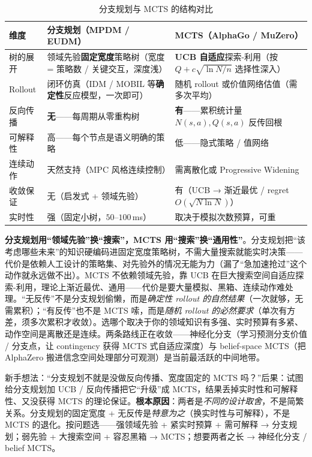 \begin{table}[H]\centering\small
\caption{分支规划与 MCTS 的结构对比}
\label{tab:pr-mcts}
\begin{tabular}{p{} p{} p{}}
\toprule
维度 & 分支规划（MPDM / EUDM） & MCTS（AlphaGo / MuZero） \\
\midrule
树的展开 & 领域先验\textbf{固定宽度}策略树（宽度 = 策略数 / 关键交互，深度浅） & \textbf{UCB 自适应}探索-利用（按 $Q+c\sqrt{\ln N/n}$ 选择性深入） \\
Rollout & 闭环仿真（IDM / MOBIL 等\textbf{确定性}反应模型，一次即可） & 随机 rollout 或价值网络估值（需多次平均） \\
反向传播 & \textbf{无}——每周期从零重构树 & \textbf{有}——累积统计量 $N(s,a),Q(s,a)$ 反传回根 \\
可解释性 & 高——每个节点是语义明确的策略 & 低——隐式策略 / 值网络 \\
连续动作 & 天然支持（MPC 风格连续控制） & 需离散化或 Progressive Widening \\
收敛保证 & 无（启发式 + 领域先验） & 有（UCB → 渐近最优 / regret $O(\sqrt{N\ln N})$） \\
实时性 & 强（固定小树，$50$--$100\,$ms） & 取决于模拟次数预算，可重 \\
\bottomrule
\end{tabular}
\end{table}

\begin{insight}
\textbf{分支规划用“领域先验”换“搜索”，MCTS 用“搜索”换“通用性”}。分支规划把“该考虑哪些未来”的知识硬编码进固定宽度策略树，不需大量搜索就能实时决策——代价是依赖人工设计的策略集、对先验外的情况无能为力（漏了“急加速抢过”这个动作就永远做不出）。MCTS 不依赖领域先验，靠 UCB 在巨大搜索空间自适应探索-利用，理论上渐近最优、通用——代价是要大量模拟、黑箱、连续动作难处理。“无反传”不是分支规划偷懒，而是\emph{确定性 rollout 的自然结果}（一次就够，无需累积）；“有反传”也不是 MCTS 嗦，而是\emph{随机 rollout 的必然要求}（单次有方差，须多次累积才收敛）。选哪个取决于你的领域知识有多强、实时预算有多紧、动作空间是离散还是连续。两条路线正在收敛——神经化分支（学习预测分支价值 / 分支点，让 contingency 获得 MCTS 式自适应深度）与 belief-space MCTS（把 AlphaZero 搬进信念空间处理部分可观测）是当前最活跃的中间地带。
\end{insight}

\begin{pitfall}
新手想法：“分支规划不就是没做反向传播、宽度固定的 MCTS 吗？”后果：试图给分支规划加 UCB / 反向传播把它“升级”成 MCTS，结果丢掉实时性和可解释性、又没获得 MCTS 的理论保证。\textbf{根本原因}：两者是\emph{不同的设计取舍}，不是简繁关系。分支规划的固定宽度 + 无反传是\emph{特意为之}（换实时性与可解释），不是 MCTS 的退化。按问题选——强领域先验 + 紧实时预算 + 需可解释 → 分支规划；弱先验 + 大搜索空间 + 容忍黑箱 → MCTS；想要两者之长 → 神经化分支 / belief MCTS。
\end{pitfall}

